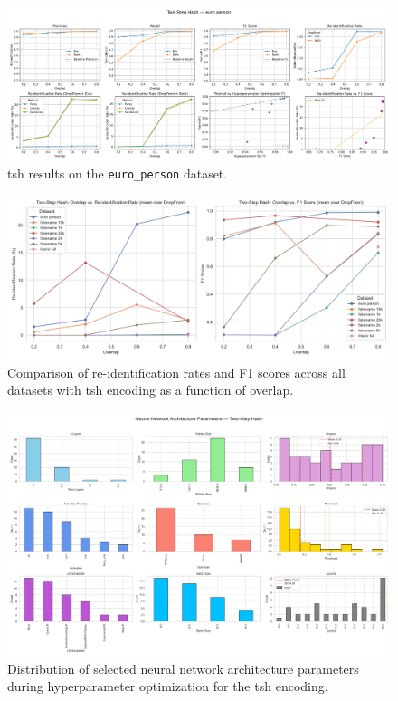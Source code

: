 \begin{figure}[H]
    \centering
    \includegraphics[width=\textwidth]{figures/TwoStepHash_euro_person_metrics.png}
    \caption{\ac{tsh} results on the \texttt{euro\_person} dataset.}
    \label{fig:twostep_euro}
\end{figure}

\begin{figure}[H]
    \centering
    \includegraphics[width=\textwidth]{figures/TwoStepHash_overlap_summary.png}
    \caption{Comparison of re-identification rates and F1 scores across all datasets with \ac{tsh} encoding as a function of overlap.}
    \label{fig:twostep_overlap}
\end{figure}

\begin{figure}[H]
    \centering
    \includegraphics[width=\textwidth]{figures/TwoStepHash_architecture.png}
    \caption{Distribution of selected neural network architecture parameters during hyperparameter optimization for the \ac{tsh} encoding.}
    \label{fig:twostep_architecture}
\end{figure}

